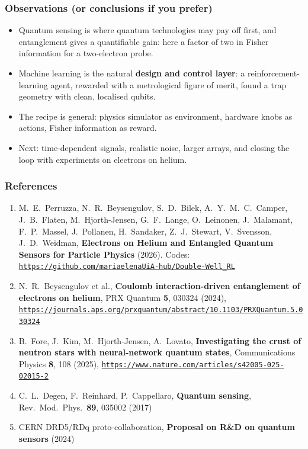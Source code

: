 \documentclass{beamer}
\begin{document}
\begin{frame}
\frametitle{Observations (or conclusions if you prefer)}
\begin{block}{}
\begin{itemize}
\item Quantum sensing is where quantum technologies may pay off first, and entanglement gives a quantifiable gain: here a factor of two in Fisher information for a two-electron probe.
\item Machine learning is the natural \textbf{design and control layer}: a reinforcement-learning agent, rewarded with a metrological figure of merit, found a trap geometry with clean, localised qubits.
\item The recipe is general: physics simulator as environment, hardware knobs as actions, Fisher information as reward.
\item Next: time-dependent signals, realistic noise, larger arrays, and closing the loop with experiments on electrons on helium.
\end{itemize}
\end{block}
\end{frame}

\begin{frame}
\frametitle{References}
\begin{enumerate}
\item M.\ E.\ Perruzza, N.\ R.\ Beysengulov, S.\ D.\ Bilek, A.\ Y.\ M.\ C.\ Camper, J.\ B.\ Flaten, M.\ Hjorth-Jensen, G.\ F.\ Lange, O.\ Leinonen, J.\ Malamant, F.\ P.\ Massel, J.\ Pollanen, H.\ Sandaker, Z.\ J.\ Stewart, V.\ Svensson, J.\ D.\ Weidman, \textbf{Electrons on Helium and Entangled Quantum Sensors for Particle Physics} (2026). Codes: \href{https://github.com/mariaelenaUiA-hub/Double-Well_RL}{\nolinkurl{https://github.com/mariaelenaUiA-hub/Double-Well_RL}}
\item N.\ R.\ Beysengulov et al., \textbf{Coulomb interaction-driven entanglement of electrons on helium}, PRX Quantum \textbf{5}, 030324 (2024), \href{https://journals.aps.org/prxquantum/abstract/10.1103/PRXQuantum.5.030324}{\nolinkurl{https://journals.aps.org/prxquantum/abstract/10.1103/PRXQuantum.5.030324}}
\item B.\ Fore, J.\ Kim, M.\ Hjorth-Jensen, A.\ Lovato, \textbf{Investigating the crust of neutron stars with neural-network quantum states}, Communications Physics \textbf{8}, 108 (2025), \href{https://www.nature.com/articles/s42005-025-02015-2}{\nolinkurl{https://www.nature.com/articles/s42005-025-02015-2}}
\item C.\ L.\ Degen, F.\ Reinhard, P.\ Cappellaro, \textbf{Quantum sensing}, Rev.\ Mod.\ Phys.\ \textbf{89}, 035002 (2017)
\item CERN DRD5/RDq proto-collaboration, \textbf{Proposal on R\&D on quantum sensors} (2024)
\end{enumerate}
\end{frame}
\end{document}
